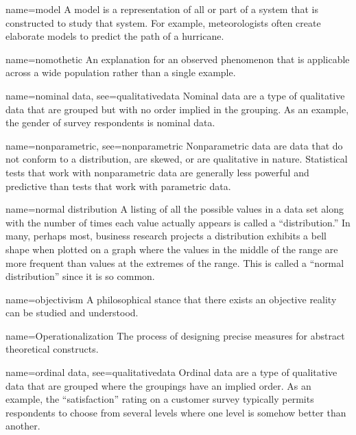 {name={model}}
{%
	A model is a representation of all or part of a system that is constructed to study that system. For example, meteorologists often create elaborate models to predict 	the path of a hurricane. 
}

{name={nomothetic}}
{%
	An explanation for an observed phenomenon that is applicable across a wide population rather than a single example.
}

{name={nominal data},
	see={qualitativedata}}
{%
	Nominal data are a type of qualitative data that are grouped but with no order implied in the grouping. As an example, the gender of survey respondents is nominal data.
}

{name={nonparametric},
	see={nonparametric}}
{%
	Nonparametric data are data that do not conform to a distribution, are skewed, or are qualitative in nature. Statistical tests that work with nonparametric data are generally less powerful and predictive than tests that work with parametric data.
}

{name={normal distribution}}
{%
	A listing of all the possible values in a data set along with the number of times each value actually appears is called a ``distribution.'' In many, perhaps most, business research projects a distribution exhibits a bell shape when plotted on a graph where the values in the middle of the range are more frequent than values at the extremes of the range. This is called a ``normal distribution'' since it is so common.
}

{name={objectivism}}
{%
	A philosophical stance that there exists an objective reality can be studied and understood.
}


{name={Operationalization}}
{%
	 The process of designing precise measures for abstract theoretical constructs. 
}

{name={ordinal data},
	see={qualitativedata}}
{%
	Ordinal data are a type of qualitative data that are grouped where the groupings have an implied order. As an example, the ``satisfaction'' rating on a customer survey typically permits respondents to choose from several levels where one level is somehow better than another.
}

